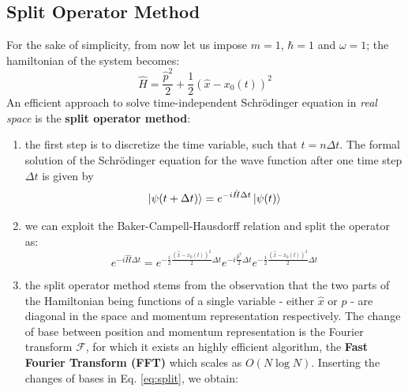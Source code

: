 \documentclass[rmp,10pt,onecolumn,fleqn,notitlepage]{revtex4-1}
\begin{document}
\subsection{Split Operator Method}

For the sake of simplicity, from now let us impose \( m=1 \), \( \hbar =1 \) and \( \omega =1 \); the hamiltonian of the system becomes:
\begin{equation}
  \hat{H} = \frac{\hat{p}^2}{2} + \frac{1}{2}  (\hat{x} - x_0(t))^2
\end{equation}
An efficient approach to solve time-independent Schrödinger equation in \emph{real space} is the \textbf{split operator method}:
\begin{enumerate}

\item the first step is to discretize the time variable, such that $t = n \Delta t$.
The formal solution of the Schrödinger equation for the wave function after one time step \( \Delta t \) is given by
\begin{equation}
  \ket{\psi (t+\Delta t)} = e^{- i \hat{H} \Delta t } \ket{\psi (t)}
\end{equation}

\item we can exploit the Baker-Campell-Hausdorff relation and split the operator as:
\begin{equation}
  e^{-i \hat{H}  \Delta t} = e^{-\frac{i}{2} \frac{(\hat{x} - x_0(t))^2}{2}   \Delta t} e^{ -i \frac{ \hat{p}^2}{2} \Delta t}  e^{-\frac{i}{2} \frac{(\hat{x} - x_0(t))^2}{2}  \Delta t}
  \label{eq:split}
\end{equation}

\item the split operator method stems from the observation that the two parts of the Hamiltonian being functions of a single variable - either \( \hat{x}  \) or \( \hat{p}  \) - are diagonal in the space and momentum representation respectively.
The change of base between position and momentum representation is the Fourier transform \( \mathcal{F} \), for which it exists an highly efficient algorithm, the \textbf{Fast Fourier Transform (FFT)} which scales as $O (N \log N )$.
Inserting the changes of bases in Eq. \eqref{eq:split}, we obtain:


\end{enumerate}
\end{document}
